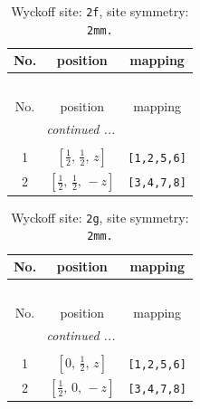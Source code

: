 \documentclass[fleqn,8pt]{jsarticle}
\begin{document}
\renewcommand{\arraystretch}{1.2}
\begin{longtable}{ccc}
\caption{Wyckoff site: {\tt 2f}, site symmetry: {\tt 2mm.}}
 \\
 \hline \hline
No. & position & mapping \\ \hline \endfirsthead

\multicolumn{2}{l}{\tablename\ \thetable{}} \\
 \hline \hline
No. & position & mapping \\ \hline \endhead

 \hline \hline
\multicolumn{2}{r}{\footnotesize\it continued ...} \\ \endfoot

 \hline \hline
\multicolumn{2}{r}{} \\ \endlastfoot

1 & $\left[ \frac{1}{2},\, \frac{1}{2},\, z \right]$ & {\tt [1,2,5,6]} \\ \hline
2 & $\left[ \frac{1}{2},\, \frac{1}{2},\, - z \right]$ & {\tt [3,4,7,8]} \\
\end{longtable}
\renewcommand{\arraystretch}{1.2}
\begin{longtable}{ccc}
\caption{Wyckoff site: {\tt 2g}, site symmetry: {\tt 2mm.}}
 \\
 \hline \hline
No. & position & mapping \\ \hline \endfirsthead

\multicolumn{2}{l}{\tablename\ \thetable{}} \\
 \hline \hline
No. & position & mapping \\ \hline \endhead

 \hline \hline
\multicolumn{2}{r}{\footnotesize\it continued ...} \\ \endfoot

 \hline \hline
\multicolumn{2}{r}{} \\ \endlastfoot

1 & $\left[ 0,\, \frac{1}{2},\, z \right]$ & {\tt [1,2,5,6]} \\ \hline
2 & $\left[ \frac{1}{2},\, 0,\, - z \right]$ & {\tt [3,4,7,8]} \\
\end{longtable}
\renewcommand{\arraystretch}{1.2}
\end{document}
